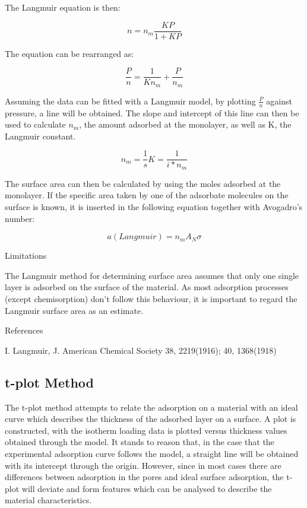 The Langmuir equation is then:

\begin{equation}
    n = n_m\frac{KP}{1+KP}
\end{equation}

The equation can be rearranged as:

\begin{equation}
	\frac{P}{n} = \frac{1}{K n_m} + \frac{P}{n_m}
\end{equation}

Assuming the data can be fitted with a Langmuir model, by plotting
\(\frac{P}{n}\) against pressure, a line will be obtained. The slope and
intercept of this line can then be used to calculate \(n_{m}\),
the amount adsorbed at the monolayer, as well as K, the Langmuir constant.

\begin{equation}
	n_m = \frac{1}{s}
	K = \frac{1}{i * n_m}
\end{equation}


The surface area can then be calculated by using the moles adsorbed at the
monolayer. If the specific area taken by one of the adsorbate molecules on
the surface is known, it is inserted in the following equation together with Avogadro's number:

\begin{equation}
	a(Langmuir) = n_m A_N \sigma
\end{equation}


Limitations

The Langmuir method for determining surface area assumes that only one single
layer is adsorbed on the surface of the material. As most adsorption processes
(except chemisorption) don't follow this behaviour, it is important to regard
the Langmuir surface area as an estimate.

References

I. Langmuir, J. American Chemical Society 38, 2219(1916); 40, 1368(1918)

\subsection{t-plot Method}

The t-plot method attempts to relate the adsorption on a material
with an ideal curve which describes the thickness of the adsorbed
layer on a surface. A plot is constructed, with the isotherm loading
data is plotted versus thickness values obtained through the model.
It stands to reason that, in the case that the experimental adsorption
curve follows the model, a straight line will be obtained with its
intercept through the origin. However, since in most cases there
are differences between adsorption in the pores and ideal surface
adsorption, the t-plot will deviate and form features which can
be analysed to describe the material characteristics.

